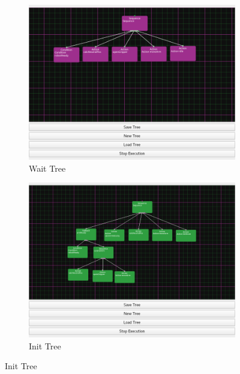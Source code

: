 \documentclass[report]{iisthesis}
\begin{document}
\begin{figure}[htp]
    \begin{subfigure}[b]{.45\linewidth}
        \includegraphics[width=\linewidth]{waitTree.png}
        \caption{Wait Tree}
    \end{subfigure}
    \begin{subfigure}[b]{.45\linewidth}
        \includegraphics[width=\linewidth]{initTree.png}
        \caption{Init Tree}
    \end{subfigure}


\end{figure}
\end{document}
